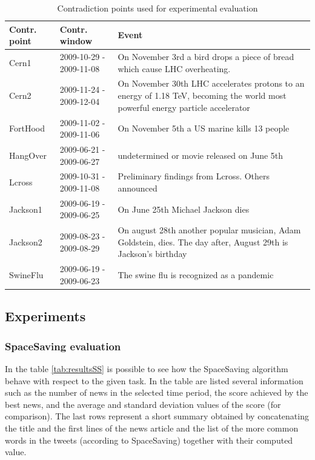 \begin{table}
	\centering
	\begin{tabularx}{\textwidth}{|l|l|X|}
	\hline
	Contr. point 	& Contr. window 			& Event \\
	\hline 
	Cern1			& 2009-10-29 - 2009-11-08 	& On November 3rd a bird drops a
piece of bread which cause LHC overheating. \\
	Cern2			& 2009-11-24 - 2009-12-04	& On November 30th LHC accelerates protons to an
energy of 1.18 TeV, becoming the world most powerful energy particle
accelerator\\
	FortHood 		& 2009-11-02 - 2009-11-06	& On November 5th a US marine
kills 13 people\\
	HangOver		& 2009-06-21 - 2009-06-27	& undetermined or movie released
	on June 5th\\
	Lcross			& 2009-10-31 - 2009-11-08	& Preliminary findings from
	Lcross. Others announced\\
	Jackson1		& 2009-06-19 - 2009-06-25	& On June 25th Michael Jackson
dies\\
	Jackson2		& 2009-08-23 - 2009-08-29	& On august 28th another popular
musician, Adam Goldstein, dies. The day after, August 29th is Jackson's
birthday\\
	SwineFlu		& 2009-06-19 - 2009-06-23	& The swine flu is recognized as
	a pandemic\\
	\hline
	\end{tabularx}
	\caption{Contradiction points used for experimental evaluation}
	\label{tab:setup}
\end{table}

\subsection*{Experiments}
\subsubsection*{SpaceSaving evaluation}
In the table \ref{tab:resultsSS} is possible to see how the SpaceSaving algorithm behave with respect to the given task.
In the table are listed several information such as the number of news in the selected time period, the score achieved by the best news, and the average and standard deviation values of the score (for comparison). The last rows represent a short summary obtained by concatenating the title and the first lines of the news article and the list of the more common words in the tweets (according to SpaceSaving) together with their computed value.


